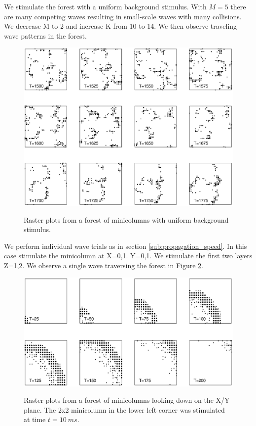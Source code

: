 We stimulate the forest with a uniform background stimulus. 
With $M=5$ there are many competing waves resulting in small-scale waves with many collisions.
We decrease M to 2 and increase K from 10 to 14.
We then observe traveling wave patterns in the forest.
\begin{figure}[!htb]
 \caption{ Raster plots from a forest of minicolumns with uniform background stimulus.}
   \includegraphics[width=\textwidth]{fig/ForestWaveRaster_Background_K14_M2}
   \label{fig:ForestBackground}
\end{figure}

We perform individual wave trials as in section \ref{sub:propagation_speed}.
In this case stimulate the minicolumn at X={0,1}. Y={0,1}.
We stimulate the first two layers Z={1,2}.
We observe a single wave traversing the forest in Figure \ref{fig:2_5D_Wave}.
\begin{figure}[!htb]
 \caption{ Raster plots from a forest of minicolumns looking down on the X/Y plane. 
           The 2x2 minicolumn in the lower left corner was stimulated at time $t=10\ ms$.}
   \includegraphics[width=\textwidth]{fig/Rasters_2_5D_Wave}
   \label{fig:2_5D_Wave}
\end{figure}


\FloatBarrier


\endinput
